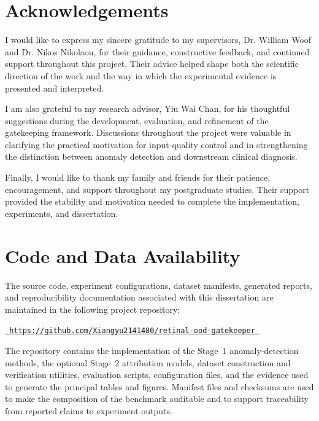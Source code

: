 \documentclass[fleqn,12pt]{olplainarticle}
\newcommand{\projectrepository}{%
https://github.com/Xiangyu2141480/retinal-ood-gatekeeper%
}
\begin{document}
\section*{Acknowledgements}
{}

I would like to express my sincere gratitude to my supervisors,
Dr. William Woof and Dr. Nikos Nikolaou, for their guidance, constructive
feedback, and continued support throughout this project. Their advice helped
shape both the scientific direction of the work and the way in which the
experimental evidence is presented and interpreted.

I am also grateful to my research advisor, Yiu Wai Chan, for his thoughtful
suggestions during the development, evaluation, and refinement of the
gatekeeping framework. Discussions throughout the project were valuable in
clarifying the practical motivation for input-quality control and in
strengthening the distinction between anomaly detection and downstream
clinical diagnosis.

Finally, I would like to thank my family and friends for their patience,
encouragement, and support throughout my postgraduate studies. Their support
provided the stability and motivation needed to complete the implementation,
experiments, and dissertation.

\clearpage

\section*{Code and Data Availability}
{}

The source code, experiment configurations, dataset manifests, generated
reports, and reproducibility documentation associated with this dissertation
are maintained in the following project repository:

\begin{center}
    \href{\projectrepository}{\texttt{\projectrepository}}
\end{center}

The repository contains the implementation of the Stage~1 anomaly-detection
methods, the optional Stage~2 attribution models, dataset construction and
verification utilities, evaluation scripts, configuration files, and the
evidence used to generate the principal tables and figures. Manifest files and
checksums are used to make the composition of the benchmark auditable and to
support traceability from reported claims to experiment outputs.
\end{document}

